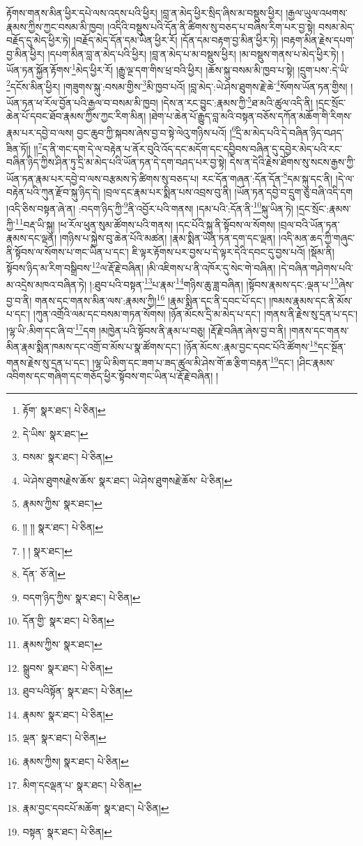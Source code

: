 རྟོགས་གནས་མིན་ཕྱིར་དཔེ་ལས་འདས་པའི་ཕྱིར། །བླ་ན་མེད་ཕྱིར་སྲིད་ཞིས་མ་བསྡུས་ཕྱིར། །རྒྱལ་ཡུལ་འཕགས་རྣམས་ཀྱིས་ཀྱང་བསམ་མི་ཁྱབ། །འདིའི་བསྡུས་པའི་དོན་ནི་ཚིགས་སུ་བཅད་པ་བཞིས་རིག་པར་བྱ་སྟེ། བསམ་མེད་བརྗོད་དུ་མེད་ཕྱིར་ཏེ། །བརྗོད་མེད་དོན་དམ་ཡིན་ཕྱིར་རོ། །དོན་དམ་བརྟག་བྱ་མིན་ཕྱིར་ཏེ། །བརྟག་མིན་རྗེས་དཔག་བྱ་མིན་ཕྱིར། །དཔག་མིན་བླ་ན་མེད་པའི་ཕྱིར། །བླ་ན་མེད་པ་མ་བསྡུས་ཕྱིར། །མ་བསྡུས་གནས་པ་མེད་ཕྱིར་ཏེ། །ཡོན་ཏན་སྐྱོན་རྟོགས་\footnote{རྟོག་  སྣར་ཐང་།  པེ་ཅིན། }མེད་ཕྱིར་རོ། །རྒྱུ་ལྔ་དག་གིས་ཕྲ་བའི་ཕྱིར། །ཆོས་སྐུ་བསམ་མི་ཁྱབ་པ་སྟེ། །དྲུག་པས་:དེ་ཡི་\footnote{དེ་ཡིས་  སྣར་ཐང་། }དངོས་མིན་ཕྱིར། །གཟུགས་སྐུ་:བསམ་གྱིས་\footnote{བསམ་  སྣར་ཐང་།  པེ་ཅིན། }མི་ཁྱབ་པའོ། །བླ་མེད་:ཡེ་ཤེས་ཐུགས་རྗེ་ཆེ་\footnote{ཡེ་ཤེས་ཐུགསརྗེས་ཆོས་  སྣར་ཐང་། ཡེ་ཤེས་ཐུགསརྗེ་ཆོས་  པེ་ཅིན། }སོགས་ཡོན་ཏན་གྱིས། །ཡོན་ཏན་ཕ་རོལ་བྱོན་པའི་རྒྱལ་བ་བསམ་མི་ཁྱབ། །དེས་ན་རང་བྱུང་:རྣམས་ཀྱི་\footnote{རྣམས་ཀྱིས་  སྣར་ཐང་། }ཐ་མའི་ཚུལ་འདི་ནི། །དྲང་སྲོང་ཆེན་པོ་དབང་ཐོབ་རྣམས་ཀྱིས་ཀྱང་རིག་མིན། །ཐེག་པ་ཆེན་པོ་རྒྱུད་བླ་མའི་བསྟན་བཅོས་དཀོན་མཆོག་གི་རིགས་རྣམ་པར་དབྱེ་བ་ལས། བྱང་ཆུབ་ཀྱི་སྐབས་ཞེས་བྱ་བ་སྟེ་ལེའུ་གཉིས་པའོ། །\footnote{།། །།  སྣར་ཐང་།  པེ་ཅིན། }དྲི་མ་མེད་པའི་དེ་བཞིན་ཉིད་བཤད་ཟིན་ཏོ།། །།\footnote{། །  སྣར་ཐང་། }ད་ནི་གང་དག་དེ་ལ་བརྟེན་པ་ནོར་བུའི་འོད་དང་མདོག་དང་དབྱིབས་བཞིན་དུ་དབྱེར་མེད་པའི་རང་བཞིན་ཉིད་ཀྱིས་ཤིན་ཏུ་དྲི་མ་མེད་པའི་ཡོན་ཏན་དེ་དག་བཤད་པར་བྱ་སྟེ། དེས་ན་དེའི་རྗེས་ཐོགས་སུ་སངས་རྒྱས་ཀྱི་ཡོན་ཏན་རྣམ་པར་དབྱེ་བ་ལས་བརྩམས་ཏེ་ཚིགས་སུ་བཅད་པ། རང་དོན་གཞན་:དོན་དོན་\footnote{དོན་  ཅོ་ནེ། }དམ་སྐུ་དང་ནི། །དེ་ལ་བརྟེན་པའི་ཀུན་རྫོབ་སྐུ་ཉིད་དེ། །བྲལ་དང་རྣམ་པར་སྨིན་པས་འབྲས་བུ་ནི། །ཡོན་ཏན་དབྱེ་བ་དྲུག་ཅུ་བཞི་འདི་དག །འདི་ཅིས་བསྟན་ཞེ་ན། :བདག་ཉིད་ཀྱི་\footnote{བདག་ཉིད་ཀྱིས་  སྣར་ཐང་།  པེ་ཅིན། }ནི་འབྱོར་པའི་གནས། །དམ་པའི་:དོན་ནི་\footnote{དོན་གྱི་  སྣར་ཐང་།  པེ་ཅིན། }སྐུ་ཡིན་ཏེ། །དྲང་སྲོང་:རྣམས་ཀྱི་\footnote{རྣམས་ཀྱིས་  སྣར་ཐང་། }བརྡ་ཡི་སྐུ། །ཕ་རོལ་ཕུན་སུམ་ཚོགས་པའི་གནས། །དང་པོའི་སྐུ་ནི་སྟོབས་ལ་སོགས། །བྲལ་བའི་ཡོན་ཏན་རྣམས་དང་ལྡན། །གཉིས་པ་སྐྱེས་བུ་ཆེན་པོའི་མཚན། །རྣམ་སྨིན་ཡོན་ཏན་དག་དང་ལྡན། །འདི་མན་ཆད་ཀྱི་གཞུང་ནི་སྟོབས་ལ་སོགས་པ་གང་ཡིན་པ་དང་། ཇི་ལྟར་རྟོགས་པར་བྱས་པ་དེ་ལྟར་དེའི་དབང་དུ་བྱས་པའོ། །སྡོམ་ནི། སྟོབས་ཉིད་མ་རིག་བསྒྲིབས་\footnote{སྒྲུབས་  སྣར་ཐང་།  པེ་ཅིན། }ལ་རྡོ་རྗེ་བཞིན། །མི་འཇིགས་པ་ནི་འཁོར་དུ་སེང་གེ་བཞིན། །དེ་བཞིན་གཤེགས་པའི་མ་འདྲེས་མཁའ་བཞིན་ཏེ། །:ཐུབ་པའི་བསྟན་\footnote{ཐུབ་པའིསྟོན་  སྣར་ཐང་།  པེ་ཅིན། }པ་རྣམ་\footnote{རྣམས་  སྣར་ཐང་།  པེ་ཅིན། }གཉིས་ཆུ་ཟླ་བཞིན། །སྟོབས་རྣམས་དང་:ལྡན་པ་\footnote{ལྡན་  སྣར་ཐང་།  པེ་ཅིན། }ཞེས་བྱ་བ་ནི། གནས་དང་གནས་མིན་ལས་:རྣམས་ཀྱི།\footnote{རྣམས་ཀྱིས།  སྣར་ཐང་།  པེ་ཅིན། } །རྣམ་སྨིན་དང་ནི་དབང་པོ་དང་། །ཁམས་རྣམས་དང་ནི་མོས་པ་དང་། །ཀུན་འགྲོའི་ལམ་དང་བསམ་གཏན་སོགས། །ཉོན་མོངས་དྲི་མ་མེད་པ་དང་། །གནས་ནི་རྗེས་སུ་དྲན་པ་དང་། །ལྷ་ཡི་:མིག་དང་ཞི་བ་\footnote{མིག་དངལྡན་པ་  སྣར་ཐང་།  པེ་ཅིན། }དག །མཁྱེན་པའི་སྟོབས་ནི་རྣམ་པ་བཅུ། །རྡོ་རྗེ་བཞིན་ཞེས་བྱ་བ་ནི། །གནས་དང་གནས་མིན་རྣམ་སྨིན་ཁམས་དང་འགྲོ་བ་མོས་པ་སྣ་ཚོགས་དང་། །ཉོན་མོངས་:རྣམ་བྱང་དབང་པོའི་ཚོགས་\footnote{རྣམ་བྱང་དབངཔོ་མཆོག་  སྣར་ཐང་།  པེ་ཅིན། }དང་སྔོན་གནས་རྗེས་སུ་དྲན་པ་དང་། །ལྷ་ཡི་མིག་དང་ཟག་པ་ཟད་ཚུལ་མི་ཤེས་གོ་ཆ་རྩིག་བརྟན་\footnote{བསྟན་  སྣར་ཐང་།  པེ་ཅིན། }དང་། །ཤིང་རྣམས་འབིགས་དང་གཞིག་དང་གཅོད་ཕྱིར་སྟོབས་གང་ཡིན་པ་རྡོ་རྗེ་བཞིན། །
